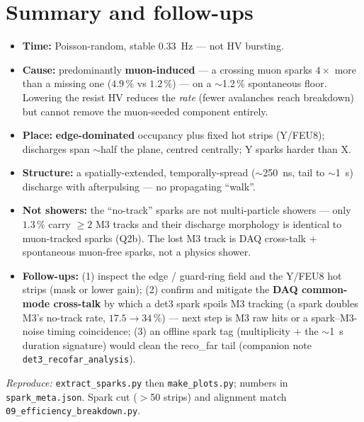 \documentclass[11pt]{article}
\begin{document}
\section{Summary and follow-ups}
\begin{itemize}\setlength\itemsep{0.15em}
  \item \textbf{Time:} Poisson-random, stable $0.33$~Hz --- not HV bursting.
  \item \textbf{Cause:} predominantly \textbf{muon-induced} --- a crossing muon sparks
        $4\times$ more than a missing one ($4.9\,\%$ vs $1.2\,\%$) --- on a $\sim$1.2\,\%
        spontaneous floor. Lowering the resist HV reduces the \emph{rate} (fewer avalanches
        reach breakdown) but cannot remove the muon-seeded component entirely.
  \item \textbf{Place:} \textbf{edge-dominated} occupancy plus fixed hot strips (Y/FEU8);
        discharges span $\sim$half the plane, centred centrally; Y sparks harder than X.
  \item \textbf{Structure:} a spatially-extended, temporally-spread ($\sim$250~ns, tail to
        $\sim$1~\textmu s) discharge with afterpulsing --- no propagating ``walk''.
  \item \textbf{Not showers:} the ``no-track'' sparks are not multi-particle showers ---
        only $1.3\,\%$ carry $\ge2$ M3 tracks and their discharge morphology is identical
        to muon-tracked sparks (Q2b). The lost M3 track is DAQ cross-talk $+$ spontaneous
        muon-free sparks, not a physics shower.
  \item \textbf{Follow-ups:} (1) inspect the edge / guard-ring field and the Y/FEU8 hot
        strips (mask or lower gain); (2) confirm and mitigate the \textbf{DAQ common-mode
        cross-talk} by which a det3 spark spoils M3 tracking (a spark doubles M3's
        no-track rate, $17.5\to34\,\%$) --- next step is M3 raw hits or a spark--M3-noise
        timing coincidence; (3) an offline spark tag (multiplicity $+$ the $\sim$1~\textmu s
        duration signature) would clean the reco\_far tail (companion note
        \texttt{det3\_recofar\_analysis}).
\end{itemize}

\vspace{0.4em}
\footnotesize\noindent\textit{Reproduce:} \texttt{extract\_sparks.py} then
\texttt{make\_plots.py}; numbers in \texttt{spark\_meta.json}. Spark cut ($>$50 strips)
and alignment match \texttt{09\_efficiency\_breakdown.py}.
\end{document}
